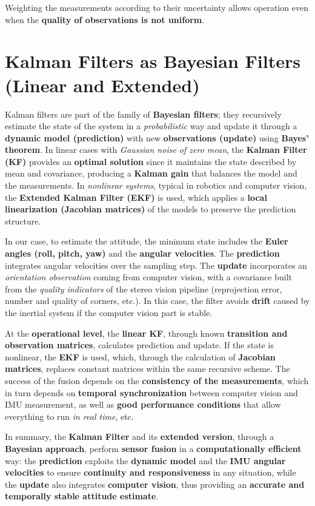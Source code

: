 Weighting the measurements according to their uncertainty allows operation even when the \textbf{quality of observations is not uniform}.  

\section{Kalman Filters as Bayesian Filters (Linear and Extended)}

Kalman filters are part of the family of \textbf{Bayesian filters}; they recursively estimate the state of the system in a \textit{probabilistic} way and update it through a \textbf{dynamic model (prediction)} with new \textbf{observations (update)} using \textbf{Bayes’ theorem}. In linear cases with \textit{Gaussian noise of zero mean}, the \textbf{Kalman Filter (KF)} provides an \textbf{optimal solution} since it maintains the state described by mean and covariance, producing a \textbf{Kalman gain} that balances the model and the measurements. In \textit{nonlinear systems}, typical in robotics and computer vision, the \textbf{Extended Kalman Filter (EKF)} is used, which applies a \textbf{local linearization (Jacobian matrices)} of the models to preserve the prediction structure.  

In our case, to estimate the attitude, the minimum state includes the \textbf{Euler angles (roll, pitch, yaw)} and the \textbf{angular velocities}. The \textbf{prediction} integrates angular velocities over the sampling step. The \textbf{update} incorporates an \textit{orientation observation} coming from computer vision, with a covariance built from the \textit{quality indicators} of the stereo vision pipeline (reprojection error, number and quality of corners, etc.). In this case, the filter avoids \textbf{drift} caused by the inertial system if the computer vision part is stable.  

At the \textbf{operational level}, the \textbf{linear KF}, through known \textbf{transition and observation matrices}, calculates prediction and update. If the state is nonlinear, the \textbf{EKF} is used, which, through the calculation of \textbf{Jacobian matrices}, replaces constant matrices within the same recursive scheme. The success of the fusion depends on the \textbf{consistency of the measurements}, which in turn depends on \textbf{temporal synchronization} between computer vision and IMU measurement, as well as \textbf{good performance conditions} that allow everything to run \textit{in real time}, etc.  

In summary, the \textbf{Kalman Filter} and its \textbf{extended version}, through a \textbf{Bayesian approach}, perform \textbf{sensor fusion} in a \textbf{computationally efficient} way: the \textbf{prediction} exploits the \textbf{dynamic model} and the \textbf{IMU angular velocities} to ensure \textbf{continuity and responsiveness} in any situation, while the \textbf{update} also integrates \textbf{computer vision}, thus providing an \textbf{accurate and temporally stable attitude estimate}.  